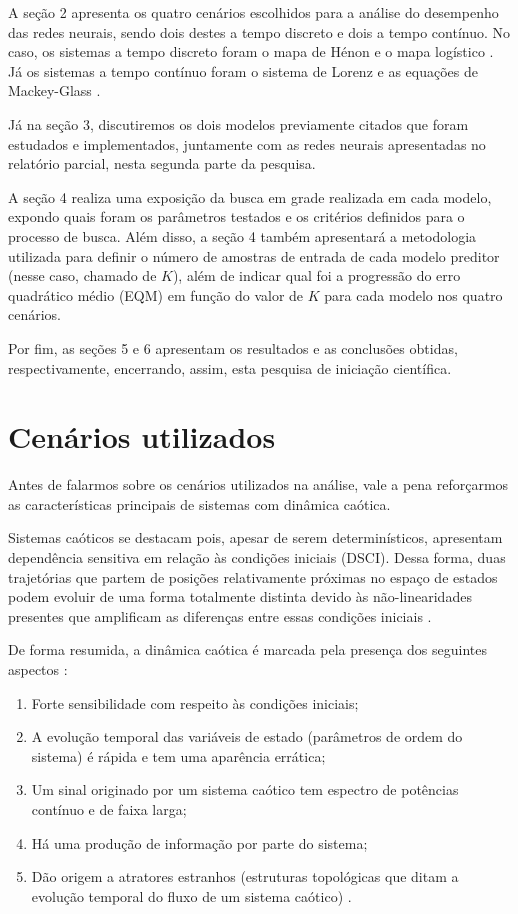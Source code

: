 \documentclass[a4paper, 12pt]{article}
\begin{document}
A seção 2 apresenta os quatro cenários escolhidos para a análise do desempenho das redes neurais, sendo dois destes a tempo discreto e dois a tempo contínuo. No caso, os sistemas a tempo discreto foram o mapa de Hénon \cite{henon1976two} e o mapa logístico \cite{may1976simple}. Já os sistemas a tempo contínuo foram o sistema de Lorenz \cite{lorenz1963deterministic} e as equações de Mackey-Glass \cite{mackey1977oscillation}.

Já na seção 3, discutiremos os dois modelos previamente citados que foram estudados e implementados, juntamente com as redes neurais apresentadas no relatório parcial, nesta segunda parte da pesquisa. 

A seção 4 realiza uma exposição da busca em grade \cite{geron2019hands} realizada em cada modelo, expondo quais foram os parâmetros testados e os critérios definidos para o processo de busca. Além disso, a seção 4 também apresentará a metodologia utilizada para definir o número de amostras de entrada de cada modelo preditor (nesse caso, chamado de $K$), além de indicar qual foi a progressão do erro quadrático médio (EQM) em função do valor de $K$ para cada modelo nos quatro cenários.

Por fim, as seções 5 e 6 apresentam os resultados e as conclusões obtidas, respectivamente, encerrando, assim, esta pesquisa de iniciação científica.
 
\section{Cenários utilizados}

Antes de falarmos sobre os cenários utilizados na análise, vale a pena reforçarmos as características principais de sistemas com dinâmica caótica. 

Sistemas caóticos se destacam pois, apesar de serem determinísticos, apresentam dependência sensitiva em relação às condições iniciais (DSCI). Dessa forma, duas trajetórias que partem de posições relativamente próximas no espaço de estados podem evoluir de uma forma totalmente distinta devido às não-linearidades presentes que amplificam as diferenças entre essas condições iniciais \cite{fiedler1994caos}.

De forma resumida, a dinâmica caótica é marcada pela presença dos seguintes aspectos \cite{attux2001dinamica}:
\begin{enumerate}
\item Forte sensibilidade com respeito às condições iniciais;
\item A evolução temporal das variáveis de estado (parâmetros de ordem do sistema) é rápida e tem uma aparência errática;
\item Um sinal originado por um sistema caótico tem espectro de potências contínuo e de faixa larga;
\item Há uma produção de informação por parte do sistema;
\item Dão origem a atratores estranhos (estruturas topológicas que ditam a evolução temporal do fluxo de um sistema caótico) \cite{ruelle1971nature}.
\end{enumerate}
\end{document}
